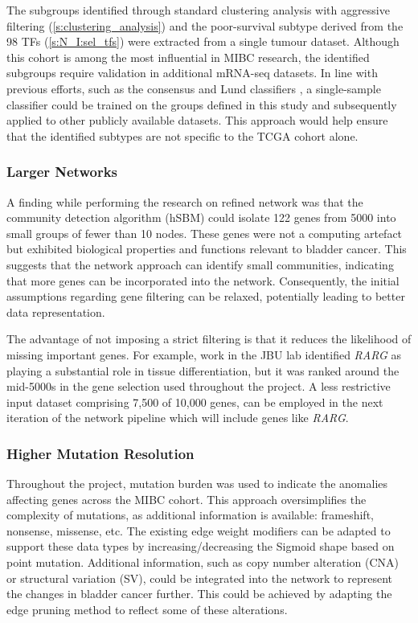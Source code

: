 The subgroups identified through standard clustering analysis with aggressive filtering (\cref{s:clustering_analysis}) and the poor-survival subtype derived from the 98 TFs (\cref{s:N_I:sel_tfs}) were extracted from a single tumour dataset. Although this cohort is among the most influential in MIBC research, the identified subgroups require validation in additional mRNA-seq datasets. In line with previous efforts, such as the consensus and Lund classifiers \citep{Marzouka2018-ge,Kamoun2020-tj}, a single-sample classifier could be trained on the groups defined in this study and subsequently applied to other publicly available datasets. This approach would help ensure that the identified subtypes are not specific to the TCGA cohort alone.

\subsubsection*{Larger Networks}

A finding while performing the research on refined network was that the community detection algorithm (hSBM) could isolate 122 genes from 5000 into small groups of fewer than 10 nodes. These genes were not a computing artefact but exhibited biological properties and functions relevant to bladder cancer. This suggests that the network approach can identify small communities, indicating that more genes can be incorporated into the network. Consequently, the initial assumptions regarding gene filtering can be relaxed, potentially leading to better data representation.

The advantage of not imposing a strict filtering is that it reduces the likelihood of missing important genes. For example, work in the JBU lab identified \textit{RARG} as playing a substantial role in tissue differentiation, but it was ranked around the mid-5000s in the gene selection used throughout the project. A less restrictive input dataset comprising 7,500 of 10,000 genes, can be employed in the next iteration of the network pipeline which will include genes like \textit{RARG}.

\subsubsection*{Higher Mutation Resolution}

Throughout the project, mutation burden was used to indicate the anomalies affecting genes across the MIBC cohort. This approach oversimplifies the complexity of mutations, as additional information is available: frameshift, nonsense, missense, etc. The existing edge weight modifiers can be adapted to support these data types by increasing/decreasing the Sigmoid shape based on point mutation. Additional information, such as copy number alteration (CNA) or structural variation (SV), could be integrated into the network to represent the changes in bladder cancer further. This could be achieved by adapting the edge pruning method to reflect some of these alterations.

